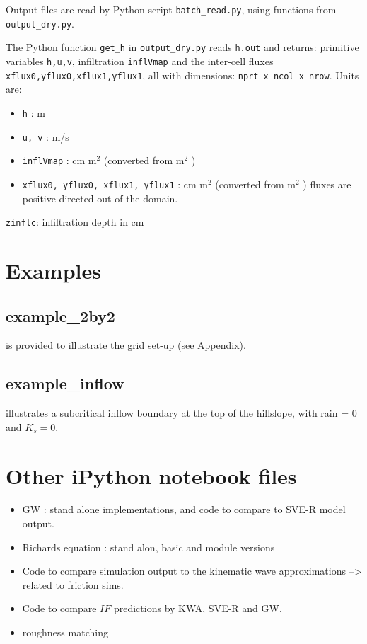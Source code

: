 \documentclass{article}
\newcommand{\code}[1]{\texttt{#1}}
\begin{document}
Output files are read by Python script \code{batch\_read.py}, using functions from \code{output\_dry.py}. 

The Python function \code{get\_h} in \code{output\_dry.py} reads \code{h.out} and returns:
primitive variables \code{h,u,v}, infiltration  \code{inflVmap} and the inter-cell fluxes \code{xflux0,yflux0,xflux1,yflux1}, all with dimensions: \code{nprt x ncol x nrow}.  
Units are:
\begin{itemize}
	\item \code{h} : m
	\item \code{u, v} : m/s
	\item \code{inflVmap} : cm m$^2$ (converted from m$^2$ )
	\item \code{xflux0, yflux0, xflux1, yflux1} : cm m$^2$ (converted from m$^2$ )
	       \subitem fluxes are positive directed out of the domain.
\end{itemize}


 \code{zinflc}: infiltration depth in cm






\section{Examples}
\subsection{example\_2by2} is provided to illustrate the grid set-up (see Appendix).
\subsection{example\_inflow} illustrates a subcritical inflow boundary at the top of the hillslope, with rain = 0 and $K_s=0$.

	
\section{Other iPython notebook files}	

\begin{itemize}
	\item GW :  stand alone implementations, and code to compare to SVE-R model output.
	\item  Richards equation : stand alon, basic and module versions
	\item  Code to compare simulation output to the kinematic wave approximations --> related to friction sims.
	\item Code to compare $IF$ predictions by KWA, SVE-R and GW.
	\item roughness matching
\end{itemize}
\end{document}
